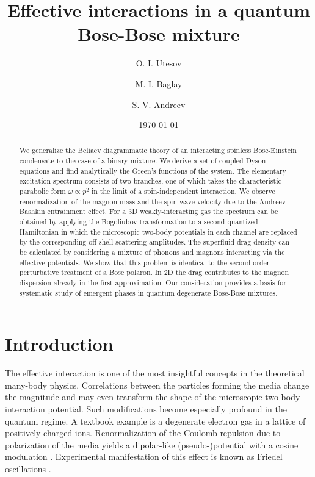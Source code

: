\documentclass[reprint,superscriptaddress,showpacs,nofootinbib,aps,pra]{revtex4-1}
\begin{document}
\title{Effective interactions in a quantum Bose-Bose mixture}

\author{O. I. Utesov}

\author{M. I. Baglay}

\author{S. V. Andreev}
\date{\today}

\begin{abstract}
We generalize the Beliaev diagrammatic theory of an interacting spinless Bose-Einstein condensate to the case of a binary mixture. We derive a set of coupled Dyson equations and find analytically the Green's functions of the system. The elementary excitation spectrum consists of two branches, one of which takes the characteristic parabolic form $\omega\propto p^2$ in the limit of a spin-independent interaction. We observe renormalization of the magnon mass and the spin-wave velocity due to the Andreev-Bashkin entrainment effect. For a 3D weakly-interacting gas the spectrum can be obtained by applying the Bogoliubov transformation to a second-quantized Hamiltonian in which the microscopic two-body potentials in each channel are replaced by the corresponding off-shell scattering amplitudes. The superfluid drag density can be calculated by considering a mixture of phonons and magnons interacting via the effective potentials. We show that this problem is identical to the second-order perturbative treatment of a Bose polaron. In 2D the drag contributes to the magnon dispersion already in the first approximation. Our consideration provides a basis for systematic study of emergent phases in quantum degenerate Bose-Bose mixtures.
\end{abstract}

\maketitle


\section{Introduction}

The effective interaction is one of the most insightful concepts in the theoretical many-body physics. Correlations between the particles forming the media change the magnitude and may even transform the shape of the microscopic two-body interaction potential. Such modifications become especially profound in the quantum regime. A textbook example is a degenerate electron gas in a lattice of positively charged ions. Renormalization of the Coulomb repulsion due to polarization of the media yields a dipolar-like (pseudo-)potential with a cosine modulation \cite{Fetter}. Experimental manifestation of this effect is known as Friedel oscillations \cite{Friedel}. 
\end{document}
